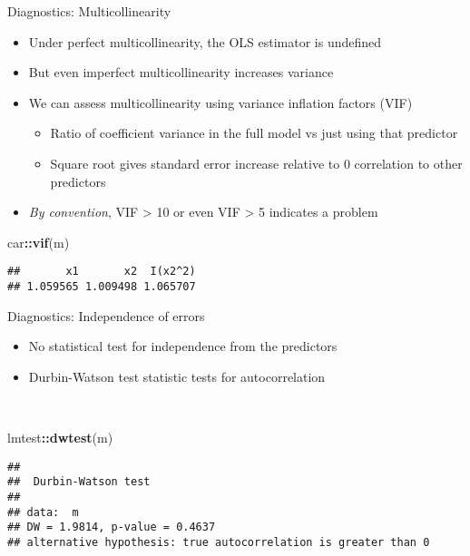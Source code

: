 \documentclass[
  ignorenonframetext,
]{beamer}
\newenvironment{Shaded}{\begin{snugshade}}{\end{snugshade}}
\newcommand{\FunctionTok}[1]{\textcolor[rgb]{0.13,0.29,0.53}{\textbf{#1}}}
\newcommand{\NormalTok}[1]{#1}
\newcommand{\SpecialCharTok}[1]{\textcolor[rgb]{0.81,0.36,0.00}{\textbf{#1}}}
\providecommand{\tightlist}{%
  \setlength{\itemsep}{0pt}\setlength{\parskip}{0pt}}
\newcommand{\setsep}{\setlength{\itemsep}{3pt}}
\newcommand{\setskip}{\setlength{\parskip}{3pt}}
\renewcommand{\tightlist}{\setsep\setskip}
\begin{document}
\begin{frame}[fragile]{Diagnostics: Multicollinearity}
\label{diagnostics-multicollinearity}
\pause

\begin{itemize}[<+->]
\tightlist
\item
  Under perfect multicollinearity, the OLS estimator is undefined
\item
  But even imperfect multicollinearity increases variance
\item
  We can assess multicollinearity using variance inflation factors (VIF)

  \begin{itemize}[<+->]
  \tightlist
  \item
    Ratio of coefficient variance in the full model vs just using that predictor
  \item
    Square root gives standard error increase relative to 0 correlation to other predictors
  \end{itemize}
\item
  \emph{By convention}, VIF \textgreater{} 10 or even VIF \textgreater{} 5 indicates a problem
\end{itemize}

\pause

\begin{Shaded}
\begin{Highlighting}[]
\NormalTok{car}\SpecialCharTok{::}\FunctionTok{vif}\NormalTok{(m)}
\end{Highlighting}
\end{Shaded}

\begin{verbatim}
##       x1       x2  I(x2^2) 
## 1.059565 1.009498 1.065707
\end{verbatim}
\end{frame}

\begin{frame}[fragile]{Diagnostics: Independence of errors}
\label{diagnostics-independence-of-errors}
\pause

\begin{itemize}[<+->]
\tightlist
\item
  No statistical test for independence from the predictors
\item
  Durbin-Watson test statistic tests for autocorrelation
\end{itemize}

\pause

~

\small

\begin{Shaded}
\begin{Highlighting}[]
\NormalTok{lmtest}\SpecialCharTok{::}\FunctionTok{dwtest}\NormalTok{(m)}
\end{Highlighting}
\end{Shaded}

\begin{verbatim}
## 
##  Durbin-Watson test
## 
## data:  m
## DW = 1.9814, p-value = 0.4637
## alternative hypothesis: true autocorrelation is greater than 0
\end{verbatim}

\normalsize
\end{frame}
\end{document}
